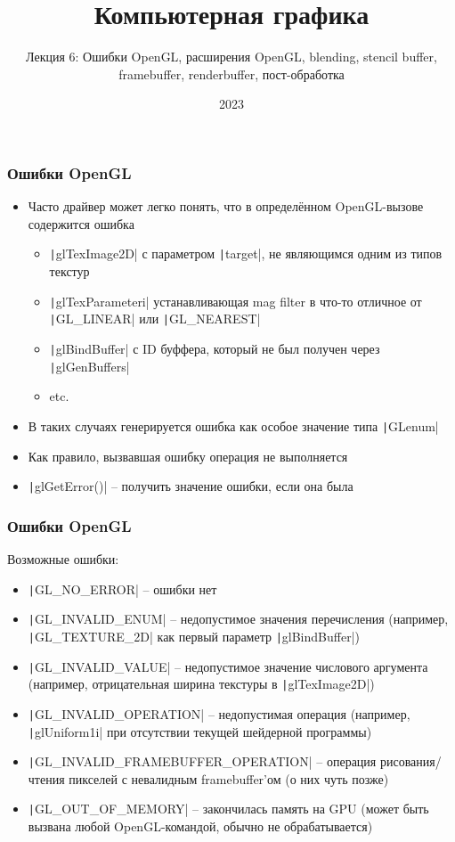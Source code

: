 \documentclass[10pt]{beamer}
\title{Компьютерная графика}
\subtitle{Лекция 6: Ошибки OpenGL, расширения OpenGL, blending, stencil buffer, framebuffer, renderbuffer, пост-обработка}
\date{2023}
\begin{document}
\frame{\titlepage}


\begin{frame}[fragile]
\frametitle{Ошибки OpenGL}
\begin{itemize}
\item Часто драйвер может легко понять, что в определённом OpenGL-вызове содержится ошибка
\pause
\begin{itemize}
\item \texttt|glTexImage2D| с параметром \texttt|target|, не являющимся одним из типов текстур
\pause
\item \texttt|glTexParameteri| устанавливающая mag filter в что-то отличное от \texttt|GL_LINEAR| или \texttt|GL_NEAREST|
\pause
\item \texttt|glBindBuffer| с ID буффера, который не был получен через \texttt|glGenBuffers|
\pause
\item etc.
\end{itemize}
\pause
\item В таких случаях генерируется ошибка как особое значение типа \texttt|GLenum|
\pause
\item Как правило, вызвавшая ошибку операция не выполняется
\pause
\item \texttt|glGetError()| -- получить значение ошибки, если она была
\end{itemize}
\end{frame}

\begin{frame}[fragile]
\frametitle{Ошибки OpenGL}
Возможные ошибки:
\begin{itemize}
\item \texttt|GL_NO_ERROR| -- ошибки нет
\pause
\item \texttt|GL_INVALID_ENUM| -- недопустимое значения перечисления (например, \texttt|GL_TEXTURE_2D| как первый параметр \texttt|glBindBuffer|)
\pause
\item \texttt|GL_INVALID_VALUE| -- недопустимое значение числового аргумента (например, отрицательная ширина текстуры в \texttt|glTexImage2D|)
\pause
\item \texttt|GL_INVALID_OPERATION| -- недопустимая операция (например, \texttt|glUniform1i| при отсутствии текущей шейдерной программы)
\pause
\item \texttt|GL_INVALID_FRAMEBUFFER_OPERATION| -- операция рисования/чтения пикселей с невалидным framebuffer'ом (о них чуть позже)
\pause
\item \texttt|GL_OUT_OF_MEMORY| -- закончилась память на GPU (может быть вызвана любой OpenGL-командой, обычно не обрабатывается)
\end{itemize}
\end{frame}
\end{document}
